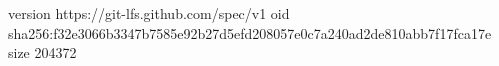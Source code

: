 version https://git-lfs.github.com/spec/v1
oid sha256:f32e3066b3347b7585e92b27d5efd208057e0c7a240ad2de810abb7f17fca17e
size 204372
